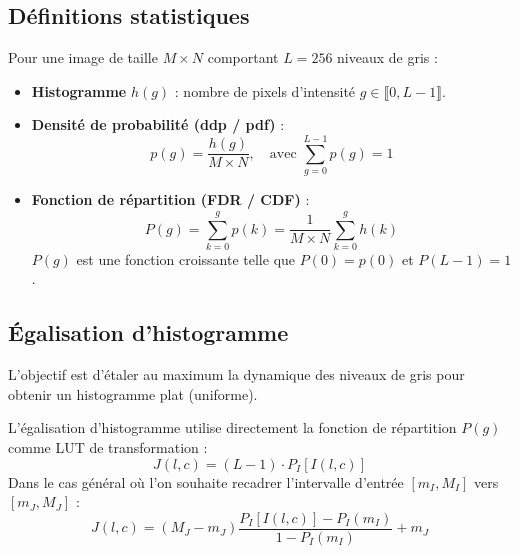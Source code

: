 \subsection{Définitions statistiques}

\begin{definition}
    Pour une image de taille $M \times N$ comportant $L = 256$ niveaux de gris :
    \begin{itemize}
        \item \textbf{Histogramme} $h(g)$ : nombre de pixels d'intensité $g \in \llbracket 0, L-1 \rrbracket$.
        \item \textbf{Densité de probabilité (ddp / pdf)} :
            \begin{equation}
                p(g) = \frac{h(g)}{M \times N}, \quad \text{avec } \sum_{g=0}^{L-1} p(g) = 1
            \end{equation}
        \item \textbf{Fonction de répartition (FDR / CDF)} :
            \begin{equation}
                P(g) = \sum_{k=0}^g p(k) = \frac{1}{M \times N} \sum_{k=0}^g h(k)
            \end{equation}
            $P(g)$ est une fonction croissante telle que $P(0) = p(0)$ et $P(L-1) = 1$.
    \end{itemize}
\end{definition}

\subsection{Égalisation d'histogramme}

L'objectif est d'étaler au maximum la dynamique des niveaux de gris pour obtenir un histogramme plat (uniforme).

\begin{theorem}
    L'égalisation d'histogramme utilise directement la fonction de répartition $P(g)$ comme LUT de transformation :
    \begin{equation}
        \boxed{J(l,c) = (L - 1) \cdot P_I[I(l,c)]}
    \end{equation}
    Dans le cas général où l'on souhaite recadrer l'intervalle d'entrée $[m_I, M_I]$ vers $[m_J, M_J]$ :
    \begin{equation}
        J(l,c) = (M_J - m_J) \frac{P_I[I(l,c)] - P_I(m_I)}{1 - P_I(m_I)} + m_J
    \end{equation}
\end{theorem}

